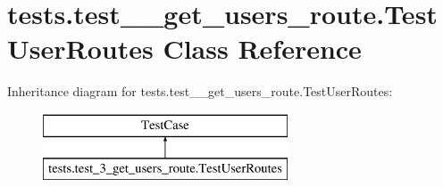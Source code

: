 \hypertarget{classtests_1_1test__3__get__users__route_1_1_test_user_routes}{}\section{tests.\+test\+\_\+\_\+get\+\_\+users\+\_\+route.\+Test\+User\+Routes Class Reference}
\label{classtests_1_1test__3__get__users__route_1_1_test_user_routes}
Inheritance diagram for tests.\+test\+\_\+\_\+get\+\_\+users\+\_\+route.\+Test\+User\+Routes\+:\begin{figure}[H]
\begin{center}
\leavevmode
\includegraphics[height=2.000000cm]{classtests_1_1test__3__get__users__route_1_1_test_user_routes}
\end{center}
\end{figure}
